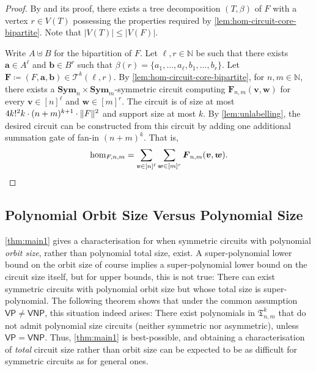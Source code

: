 \documentclass[10pt,a4paper]{article}
\theoremstyle{definition}
\theoremstyle{plain}
\theoremstyle{remark}
\DeclarePairedDelimiter{\norm}{\lVert}{\rVert}
\newcommand{\Sym}{\mathbf{Sym}}
\newcommand{\VP}{\mathsf{VP}}
\newcommand{\VNP}{\mathsf{VNP}}
\begin{document}
 	\thmHomCircuit*
 	\begin{proof}
 		By \cite[Lemma~6]{seppelt_algorithmic_2024} and its proof, 
 		there exists a tree decomposition $(T, \beta)$ of $F$ with a vertex $r \in V(T)$ possessing the properties required by \cref{lem:hom-circuit-core-bipartite}.
 		Note that $|V(T)| \leq |V(F)|$.
 		
 		Write $A \uplus B$ for the bipartition of $F$.
 		Let $\ell, r \in \mathbb{N}$ be such that there exists $\boldsymbol{a} \in A^\ell$ and $\boldsymbol{b} \in B^r$ such that $\beta(r) = \{a_1, \dots, a_\ell, b_1, \dots, b_r\}$.
 		Let $\boldsymbol{F} \coloneqq (F, \boldsymbol{a}, \boldsymbol{b}) \in \mathcal{T}^k(\ell, r)$.
 		By \cref{lem:hom-circuit-core-bipartite}, 
 		for $n,m \in \mathbb{N}$,
 		there exists a $\Sym_n \times \Sym_m$-symmetric circuit computing $\boldsymbol{F}_{n,m}(\boldsymbol{v}, \boldsymbol{w})$
 		for every $\boldsymbol{v} \in [n]^\ell$ and $\boldsymbol{w} \in [m]^r$.
 		The circuit is of size at most $4 k!^2 k \cdot (n+m)^{k+1} \cdot \norm{F}^2$ and support size at most $k$.
 		By \cref{lem:unlabelling}, the desired circuit can be constructed from this circuit by adding one additional summation gate of fan-in $(n+m)^k$.
 		That is,
 		\[
 			\hom_{F, n,m} = \sum_{\boldsymbol{v} \in [n]^\ell} \sum_{\boldsymbol{w} \in [m]^r} \boldsymbol{F}_{n,m}(\boldsymbol{v}, \boldsymbol{w}). \qedhere
 		\]
 	\end{proof}
 	
	
	\subsection{Polynomial Orbit Size Versus Polynomial Size}
	
	\cref{thm:main1} gives a characterisation for when symmetric circuits with polynomial \emph{orbit size}, rather than polynomial total size, exist. A super-polynomial lower bound on the orbit size of course implies a super-polynomial lower bound on the circuit size itself, but for upper bounds, this is not true: There can exist symmetric circuits with polynomial orbit size but whose total size is super-polynomial. The following theorem shows that under the common assumption $\VP \neq \VNP$, this situation indeed arises: There exist polynomials in $\mathfrak{T}_{n,m}^k$ that do not admit polynomial size circuits (neither symmetric nor asymmetric), unless $\VP = \VNP$. Thus, \cref{thm:main1} is best-possible, and obtaining a characterisation of \emph{total} circuit size rather than orbit size can be expected to be as difficult for symmetric circuits as for general ones.
	
\end{document}
